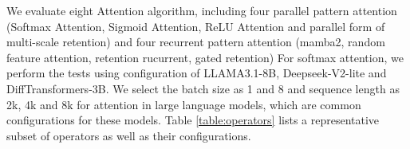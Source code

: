 

 We evaluate eight Attention algorithm, including four parallel pattern attention (Softmax Attention\cite{Ashish17AttentionIsAllYouNeed}, Sigmoid Attention\cite{ramapuram2024sigmoidattn}, ReLU Attention\cite{wortsman2023replacingsoftmaxreluvision} and parallel form of multi-scale retention\cite{sun2023retentive}) and four recurrent pattern attention (mamba2\cite{dao2024mamba2}, random feature attention\cite{peng2021randomfeatureattention}, retention rucurrent\cite{sun2023retentive}, gated retention\cite{sun2024YOCO}) 
For softmax attention, we perform the tests using configuration of LLAMA3.1-8B\cite{dubey2024llama3}, Deepseek-V2-lite\cite{deepseekai2024deepseekv2strongeconomicalefficient} and DiffTransformers-3B\cite{ye2024differentialtransformer}.
We select the batch size as 1 and 8 and sequence length as 2k, 4k and 8k for attention in large language models, which are common configurations for these models. 
Table \ref{table:operators} lists a representative subset of operators as well as
their configurations.

